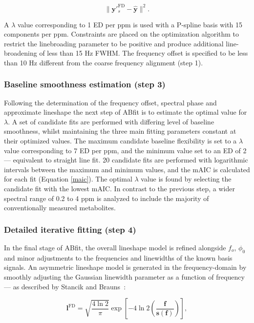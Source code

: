 \documentclass[num-refs]{wiley-article}
\begin{document}
\begin{equation}
  \| \textbf{y}'^{\mathrm{FD}}_{s}  - \hat{\textbf{y}} \|^{2}.
  \label{obj_fn}
\end{equation}

A $\lambda$ value corresponding to 1 ED per ppm is used with a P-spline basis with 15 components per ppm. Constraints are placed on the optimization algorithm to restrict the linebroading parameter to be positive and produce additional line-broadening of less than 15 Hz FWHM. The frequency offset is specified to be less than 10 Hz different from the coarse frequency alignment (step 1).

\subsubsection{Baseline smoothness estimation (step 3)}
Following the determination of the frequency offset, spectral phase and approximate lineshape the next step of ABfit is to estimate the optimal value for $\lambda$. A set of candidate fits are performed with differing level of baseline smoothness, whilst maintaining the three main fitting parameters constant at their optimized values. The maximum candidate baseline flexibility is set to a $\lambda$ value corresponding to 7 ED per ppm, and the minimum value set to an ED of 2 --- equivalent to straight line fit. 20 candidate fits are performed with logarithmic intervals between the maximum and minimum values, and the mAIC is calculated for each fit (Equation \ref{maic}). The optimal $\lambda$ value is found by selecting the candidate fit with the lowest mAIC. In contrast to the previous step, a wider spectral range of 0.2 to 4 ppm is analyzed to include the majority of conventionally measured metabolites.

\subsubsection{Detailed iterative fitting (step 4)}
In the final stage of ABfit, the overall lineshape model is refined alongside $f_{o}$, $\phi_{0}$ and minor adjustments to the frequencies and linewidths of the known basis signals. An asymmetric lineshape model is generated in the frequency-domain by smoothly adjusting the Gaussian linewidth parameter as a function of frequency --- as described by Stancik and Brauns~\cite{Stancik2008}:

\begin{equation}
  \mathbf{l}^{\mathrm{FD}} = \sqrt{\frac{4 \ln 2}{\pi}} \exp \left[ -4 \ln2 \left( \frac{\mathbf{f}}{\mathbf{s}(\mathbf{f})} \right) \right],
\end{equation}
\end{document}
